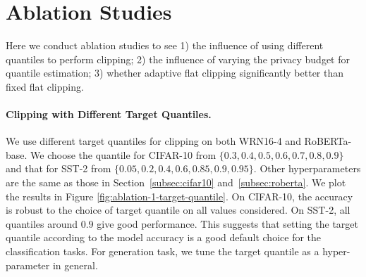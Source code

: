 
\section{Ablation Studies} \label{app:ablation}

Here we conduct ablation studies to see 1) the influence of  using different quantiles to perform clipping; 2) the influence of varying the privacy budget for quantile estimation; 3) whether adaptive flat clipping significantly better than fixed flat clipping.


\paragraph{Clipping with Different Target Quantiles.}
We use different target quantiles for clipping on both WRN16-4 and RoBERTa-base. We choose the quantile for CIFAR-10 from $\{0.3,0.4,0.5,0.6,0.7,0.8,0.9\}$ and that for SST-2 from $\{0.05, 0.2, 0.4, 0.6, 0.85, 0.9, 0.95\}$. Other hyperparameters  are the same as those in Section~\ref{subsec:cifar10} and~\ref{subsec:roberta}. We plot the results in Figure \ref{fig:ablation-1-target-quantile}. On CIFAR-10, the accuracy is robust to the choice of target quantile on all values considered. On SST-2, all quantiles around $0.9$ give good performance. This suggests that setting the target quantile according to the model accuracy is a good default choice for the classification tasks. For generation task, we tune the target quantile as a hyper-parameter in general.

